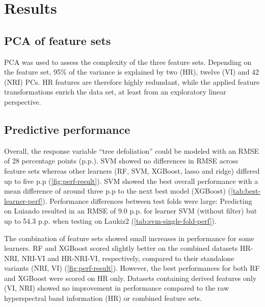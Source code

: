 \documentclass[final]{IEEEtran}
\begin{document}
\section{Results}

\subsection{PCA of feature sets}

PCA was used to assess the complexity of the three feature sets.
Depending on the feature set, 95\% of the variance is explained by two (HR), twelve (VI) and 42 (NRI) \ac{PC}s.
HR features are therefore highly redundant, while the applied feature transformations enrich the data set, at least from an exploratory linear perspective.

\subsection{Predictive performance}

Overall, the response variable \enquote{tree defoliation} could be modeled with an \ac{RMSE} of 28 percentage points (p.p.).
SVM showed no differences in RMSE across feature sets whereas other learners (RF, SVM, XGBoost, lasso and ridge) differed up to five p.p (\autoref{fig:perf-result}).
SVM showed the best overall performance with a mean difference of around three p.p to the next best model (XGBoost) (\autoref{tab:best-learner-perf}).
Performance differences between test folds were large: Predicting on Luiando resulted in an RMSE of 9.0 p.p. for learner SVM (without filter) but up to 54.3 p.p. when testing on Laukiz2 (\autoref{tab:svm-single-fold-perf}).

The combination of feature sets showed small increases in performance for some learners.
RF and XGBoost scored slightly better on the combined datasets HR-NRI, NRI-VI and HR-NRI-VI, respectively, compared to their standalone variants (NRI, VI) (\autoref{fig:perf-result}).
However, the best performances for both RF and XGBoost were scored on HR only.
Datasets containing derived features only (VI, NRI) showed no improvement in performance compared to the raw hyperspectral band information (HR) or combined feature sets.
\end{document}
